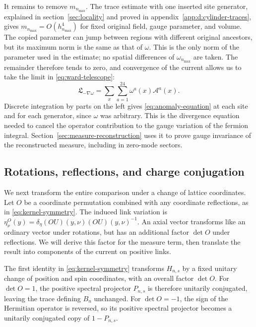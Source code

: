 \documentclass[11pt,a4paper]{article}
\theoremstyle{remark}
\begin{document}
It remains to remove $m_{n_{\max}}$. The trace estimate with one
inserted site generator, explained in section~\ref{sec:locality} and
proved in appendix~\ref{app:d:cylinder-traces}, gives
$m_{n_{\max}}=O(h_{n_{\max}}^4)$ for fixed original field, gauge
parameter, and volume. The copied parameter can jump between regions
with different original ancestors, but its maximum norm is the same
as that of $\omega$. This is the only norm of the parameter used in
the estimate; no spatial differences of $\omega_{n_{\max}}$ are taken.
The remainder therefore tends to zero, and convergence of the current
allows us to take the limit in \eqref{eq:ward-telescope}:
\begin{equation}
 \mathfrak L_{-\nabla\omega}
       =\sum_x\sum_{a=1}^{24}\omega^a(x)\mathcal A^a(x).
\end{equation}
Discrete integration by parts on the left gives
\eqref{eq:anomaly-equation} at each site and for each generator,
since $\omega$ was arbitrary. This is the divergence equation needed
to cancel the operator contribution to the gauge variation of the
fermion integral. Section~\ref{sec:measure-reconstruction} uses it
to prove gauge invariance of the reconstructed measure, including in
zero-mode sectors.

\subsection{Rotations, reflections, and charge conjugation}

We next transform the entire comparison under a change of lattice
coordinates. Let $O$ be a coordinate permutation combined with any
coordinate reflections, as in \eqref{eq:kernel-symmetry}. The induced
link variation is
$\eta^O_\nu(y)=\delta_\eta(OU)(y,\nu)(OU)(y,\nu)^{-1}$.
An axial vector transforms like an ordinary vector under rotations,
but has an additional factor $\det O$ under reflections. We will
derive this factor for the measure term, then translate the result
into components of the current on positive links.

The first identity in \eqref{eq:kernel-symmetry} transforms
$H_{n,s}$ by a fixed unitary change of position and spin coordinates,
with an overall factor $\det O$. For $\det O=1$, the positive
spectral projector $P_{n,s}$ is therefore unitarily conjugated, leaving
the trace defining $B_n$ unchanged. For $\det O=-1$, the sign of
the Hermitian operator is reversed, so its positive spectral projector
becomes a unitarily conjugated copy of $1-P_{n,s}$.
\end{document}
